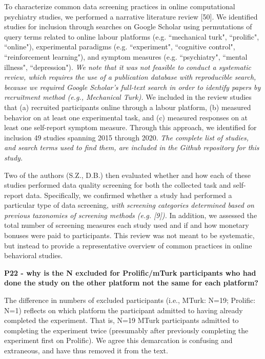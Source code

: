 \documentclass[a4paper,notitlepage,12pt]{article}
\begin{document}
\begin{displayquote}
To characterize common data screening practices in online computational psychiatry studies, we performed a narrative literature review [50]. We identified studies for inclusion through searches on Google Scholar using permutations of query terms related to online labour platforms (e.g. ``mechanical turk", ``prolific", ``online"), experimental paradigms (e.g. ``experiment", ``cognitive control", ``reinforcement learning"), and symptom measures (e.g. ``psychiatry", ``mental illness", ``depression"). \textit{We note that it was not feasible to conduct a systematic review, which requires the use of a publication database with reproducible search, because we required Google Scholar's full-text search in order to identify papers by recruitment method (e.g., Mechanical Turk).} We included in the review studies that (a) recruited participants online through a labour platform, (b) measured behavior on at least one experimental task, and (c) measured responses on at least one self-report symptom measure. Through this approach, we identified for inclusion 49 studies spanning 2015 through 2020. \textit{The complete list of studies, and search terms used to find them, are included in the Github repository for this study.}
\end{displayquote}

\begin{displayquote}
Two of the authors (S.Z., D.B.) then evaluated whether and how each of these studies performed data quality screening for both the collected task and self-report data. Specifically, we confirmed whether a study had performed a particular type of data screening,  \textit{with screening categories determined based on previous taxonomies of screening methods (e.g. [9]).} In addition, we assessed the total number of screening measures each study used and if and how monetary bonuses were paid to participants. This review was not meant to be systematic, but instead to provide a representative overview of common practices in online behavioral studies.
\end{displayquote}

\textbf{P22 - why is the N excluded for Prolific/mTurk participants who had done the study on the other platform not the same for each platform?}

The difference in numbers of excluded participants (i.e., MTurk: N=19; Prolific: N=1) reflects on which platform the participant admitted to having already completed the experiment. That is, N=19 MTurk participants admitted to completing the experiment twice (presumably after previously completing the experiment first on Prolific). We agree this demarcation is confusing and extraneous, and have thus removed it from the text.
\end{document}
